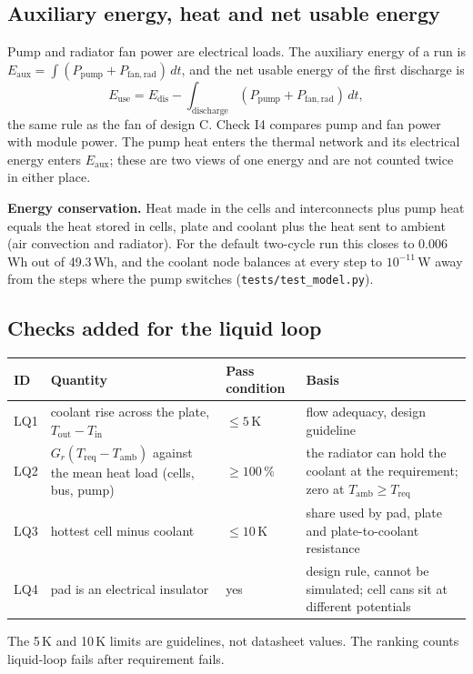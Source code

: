 \documentclass[11pt,a4paper]{article}
\begin{document}
\subsection{Auxiliary energy, heat and net usable energy}
Pump and radiator fan power are electrical loads. The auxiliary energy of a run is $E_{\mathrm{aux}}=\int(P_{\mathrm{pump}}+P_{\mathrm{fan,rad}})\,dt$, and the net usable energy of the first discharge is
\begin{equation}
E_{\mathrm{use}}=E_{\mathrm{dis}}-\int_{\mathrm{discharge}}(P_{\mathrm{pump}}+P_{\mathrm{fan,rad}})\,dt ,
\end{equation}
the same rule as the fan of design C. Check I4 compares pump and fan power with module power. The pump heat enters the thermal network and its electrical energy enters $E_{\mathrm{aux}}$; these are two views of one energy and are not counted twice in either place.

\textbf{Energy conservation.} Heat made in the cells and interconnects plus pump heat equals the heat stored in cells, plate and coolant plus the heat sent to ambient (air convection and radiator). For the default two-cycle run this closes to 0.006\,Wh out of 49.3\,Wh, and the coolant node balances at every step to $10^{-11}$\,W away from the steps where the pump switches (\texttt{tests/test\_model.py}).

\subsection{Checks added for the liquid loop}
\begin{longtable}{@{}p{0.9cm}p{5.2cm}p{3.1cm}p{5.7cm}@{}}
\toprule
ID & Quantity & Pass condition & Basis \\
\midrule
\endhead
LQ1 & coolant rise across the plate, $T_{\mathrm{out}}-T_{\mathrm{in}}$ & $\le 5$\,K & flow adequacy, design guideline \\
LQ2 & $G_r(T_{\mathrm{req}}-T_{\mathrm{amb}})$ against the mean heat load (cells, bus, pump) & $\ge 100$\,\% & the radiator can hold the coolant at the requirement; zero at $T_{\mathrm{amb}}\ge T_{\mathrm{req}}$ \\
LQ3 & hottest cell minus coolant & $\le 10$\,K & share used by pad, plate and plate-to-coolant resistance \\
LQ4 & pad is an electrical insulator & yes & design rule, cannot be simulated; cell cans sit at different potentials \\
\bottomrule
\end{longtable}
The 5\,K and 10\,K limits are guidelines, not datasheet values. The ranking counts liquid-loop fails after requirement fails.
\end{document}
